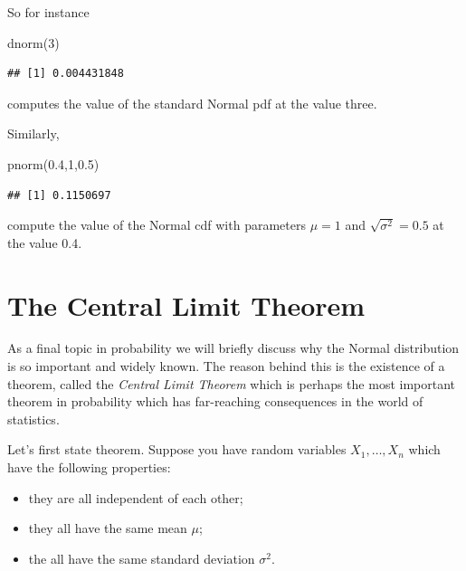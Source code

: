 \documentclass[
]{book}
\newenvironment{Shaded}{\begin{snugshade}}{\end{snugshade}}
\newcommand{\DecValTok}[1]{\textcolor[rgb]{0.00,0.00,0.81}{#1}}
\newcommand{\FloatTok}[1]{\textcolor[rgb]{0.00,0.00,0.81}{#1}}
\newcommand{\FunctionTok}[1]{\textcolor[rgb]{0.00,0.00,0.00}{#1}}
\newcommand{\NormalTok}[1]{#1}
\begin{document}
So for instance

\begin{Shaded}
\begin{Highlighting}[]
\FunctionTok{dnorm}\NormalTok{(}\DecValTok{3}\NormalTok{)}
\end{Highlighting}
\end{Shaded}

\begin{verbatim}
## [1] 0.004431848
\end{verbatim}

computes the value of the standard Normal pdf at the value three.

Similarly,

\begin{Shaded}
\begin{Highlighting}[]
\FunctionTok{pnorm}\NormalTok{(}\FloatTok{0.4}\NormalTok{,}\DecValTok{1}\NormalTok{,}\FloatTok{0.5}\NormalTok{)}
\end{Highlighting}
\end{Shaded}

\begin{verbatim}
## [1] 0.1150697
\end{verbatim}

compute the value of the Normal cdf with parameters \(\mu=1\) and \(\sqrt{\sigma^2}=0.5\) at the value 0.4.

\hypertarget{the-central-limit-theorem}{%
\section{The Central Limit Theorem}\label{the-central-limit-theorem}}

As a final topic in probability we will briefly discuss why the Normal distribution is so important and widely known. The reason behind this is the existence of a theorem, called the \emph{Central Limit Theorem} which is perhaps the most important theorem in probability which has far-reaching consequences in the world of statistics.

Let's first state theorem. Suppose you have random variables \(X_1,\dots, X_n\) which have the following properties:

\begin{itemize}
\item
  they are all independent of each other;
\item
  they all have the same mean \(\mu\);
\item
  the all have the same standard deviation \(\sigma^2\).
\end{itemize}
\end{document}
